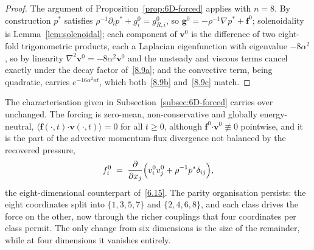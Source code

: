 \documentclass[11pt]{jfm}
\let\ge=\geqslant  \let\geq=\geqslant
\providecommand\bcdot{\boldsymbol{\cdot}}
\numberwithin{equation}{section}
\begin{document}
\begin{proof}
The argument of Proposition~\ref{prop:6D-forced} applies with $n=8$. By construction $p^{*}$
satisfies $\rho^{-1}\partial_ip^{*}+g_i^0=g_{R,i}^0$, so
$\boldsymbol{g}^0=-\rho^{-1}\nabla p^{*}+\boldsymbol{f}^0$; solenoidality is
Lemma~\ref{lem:solenoidal}; each component of $\boldsymbol{v}^0$ is the difference of two eight-fold trigonometric products,
each a Laplacian eigenfunction with eigenvalue $-8\alpha^2$, so by linearity
$\nabla^2\boldsymbol{v}^0=-8\alpha^2\boldsymbol{v}^0$ and the unsteady and viscous terms cancel exactly under the decay
factor of~\eqref{8.9a}; and the convective term, being quadratic, carries
$e^{-16\alpha^2\kappa t}$, which both~\eqref{8.9b} and~\eqref{8.9c} match.
\end{proof}

\noindent The characterisation given in Subsection~\ref{subsec:6D-forced} carries over unchanged.
The forcing is zero-mean, non-conservative and globally energy-neutral,
$\bigl\langle\boldsymbol{f}(\cdot,t)\bcdot\boldsymbol{v}(\cdot,t)\bigr\rangle=0$ for all $t\ge0$,
although $\boldsymbol{f}^0\bcdot\boldsymbol{v}^0\not\equiv0$ pointwise, and it is the part of the advective
momentum-flux divergence not balanced by the recovered pressure,
\begin{equation}
\label{8.10}
f_i^0 \;=\; \frac{\partial}{\partial x_j}\Bigl(v_i^0 v_j^0 + \rho^{-1}p^{*}\delta_{ij}\Bigr),
\end{equation}
the eight-dimensional counterpart of~\eqref{6.15}. The parity organisation persists: the eight
coordinates split into $\{1,3,5,7\}$ and $\{2,4,6,8\}$, and each class drives the force on the
other, now through the richer couplings that four coordinates per class permit. The only change
from six dimensions is the size of the remainder, while at four dimensions it vanishes entirely.
\end{document}
